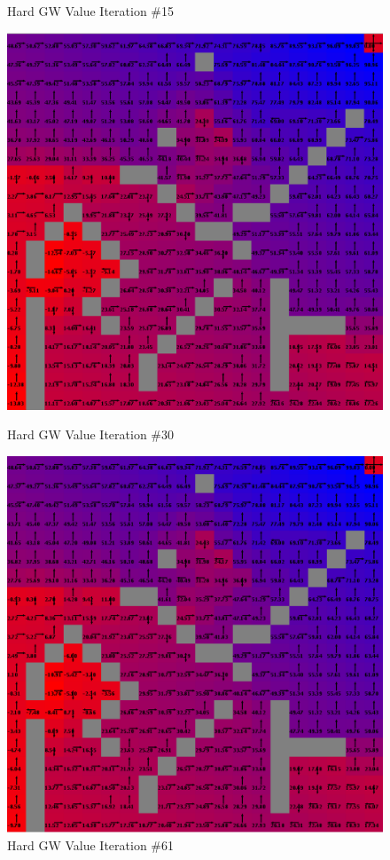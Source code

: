 \documentclass[h]{article}
\begin{document}
\begin{figure}[H]
      \caption*{Hard GW Value Iteration \#15} 
   \endminipage\hfill
      \includegraphics[width=1\textwidth,keepaspectratio]{hard-value-30.png} 
      \caption*{Hard GW Value Iteration \#30} 
   \endminipage\hfill
      \includegraphics[width=1\textwidth,keepaspectratio]{hard-value-61.png} 
      \caption*{Hard GW Value Iteration \#61} 
   \endminipage\hfill
\end{figure}
\end{document}
